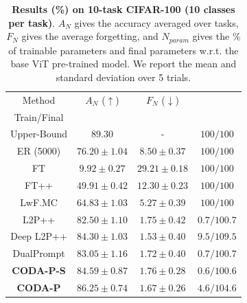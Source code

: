 \begin{table}[t]
\caption{\textbf{Results (\%) on 10-task CIFAR-100 (10 classes per task)}. $A_N$ gives the accuracy averaged over tasks, $F_N$ gives the average forgetting, and $N_{param}$ gives the \% of trainable parameters and final parameters w.r.t. the base ViT pre-trained model. We report the mean and standard deviation over 5 trials.}
\vspace{-2mm}
\centering
\label{tab_2:cifar}
\begin{tabular}{c||c|c|c} 
\hline
\rule{0pt}{10pt} Method & $A_N$ ($\uparrow$) & $F_N$ ($\downarrow$) & \thead{$N_{param}$ ($\downarrow$) \\ Train/Final}\\
\hline
Upper-Bound  & $89.30$ & - & $100/100$  \\  
\hline
ER (5000)    & $76.20 \pm 1.04$ & $8.50 \pm 0.37$ & $100/100$  \\ 
FT           & $9.92 \pm 0.27$ & $29.21 \pm 0.18$ & $100/100$  \\  
FT++         & $49.91 \pm 0.42$ & $12.30 \pm 0.23$ & $100/100$  \\  
LwF.MC       & $64.83 \pm 1.03$ & $5.27 \pm 0.39$ & $100/100$  \\ 
L2P++        & $82.50 \pm 1.10$ & $1.75 \pm 0.42$ & $ 0.7/100.7$  \\
Deep L2P++   & $84.30 \pm 1.03$ & $\bm{1.53 \pm 0.40}$ & $ 9.5/109.5$  \\  
DualPrompt   & $83.05 \pm 1.16$ & $1.72 \pm 0.40$ & $ 0.7/100.7$  \\
\hdashline
\textbf{CODA-P-S}  & $84.59 \pm 0.87$ & $1.76 \pm 0.28$ & $ 0.6/100.6$  \\
\textbf{CODA-P}    & $\bm{86.25 \pm 0.74}$ & $1.67 \pm 0.26$ & $ 4.6/104.6$  \\

\hline
\end{tabular}

\vspace{9mm}


\end{table}
